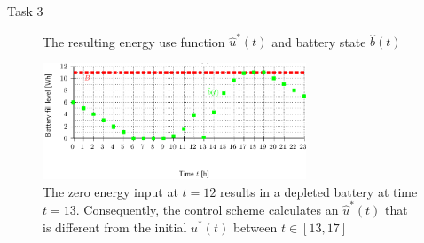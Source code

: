 \begin{frame}[allowframebreaks]{Task 3}{}
\begin{solutionnoinc}
\begin{figure}
      \caption{The resulting energy use function $\hat u^*(t)$ and battery state $\hat b(t)$}
    \end{figure}
  \end{solutionnoinc}
  \begin{solutionnoinc}
    \begin{figure}
      \centering
      \includegraphics[width=0.7\textwidth]{./figures/task5_battery.png}
      \caption{The zero energy input at $t = 12$ results in a depleted battery at time $t = 13$. Consequently, the control scheme calculates an $\hat u^*(t)$ that is different from the initial $u^*(t)$ between $t \in [13, 17]$}
    \end{figure}
  \end{solutionnoinc}
\end{frame}
